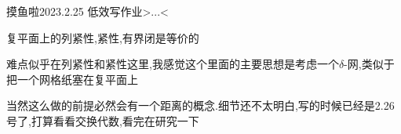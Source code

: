 \begin{diary}{摸鱼啦}{2023.2.25}
    低效写作业>...<

    复平面上的列紧性,紧性,有界闭是等价的

    难点似乎在列紧性和紧性这里,我感觉这个里面的主要思想是考虑一个$\delta$-网,类似于把一个网格纸塞在复平面上

    当然这么做的前提必然会有一个距离的概念.细节还不太明白,写的时候已经是2.26号了,打算看看交换代数,看完在研究一下

\end{diary}
